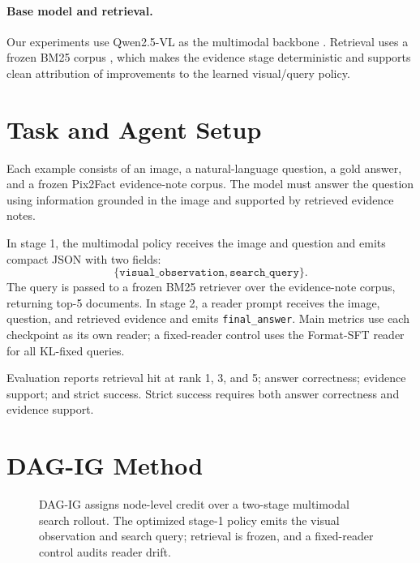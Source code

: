 \documentclass[11pt]{article}
\begin{document}
\paragraph{Base model and retrieval.}
Our experiments use Qwen2.5-VL as the multimodal backbone \cite{qwen2025qwen25vl}. Retrieval uses a frozen BM25 corpus \cite{robertson1994okapi}, which makes the evidence stage deterministic and supports clean attribution of improvements to the learned visual/query policy.

\section{Task and Agent Setup}

Each example consists of an image, a natural-language question, a gold answer, and a frozen Pix2Fact evidence-note corpus. The model must answer the question using information grounded in the image and supported by retrieved evidence notes.

In stage 1, the multimodal policy receives the image and question and emits compact JSON with two fields:
\[
\{\texttt{visual\_observation},\texttt{search\_query}\}.
\]
The query is passed to a frozen BM25 retriever over the evidence-note corpus, returning top-5 documents. In stage 2, a reader prompt receives the image, question, and retrieved evidence and emits \texttt{final\_answer}. Main metrics use each checkpoint as its own reader; a fixed-reader control uses the Format-SFT reader for all KL-fixed queries.

Evaluation reports retrieval hit at rank 1, 3, and 5; answer correctness; evidence support; and strict success. Strict success requires both answer correctness and evidence support.

\section{DAG-IG Method}

\begin{figure}[t]
\centering
\resizebox{\linewidth}{!}{}
\caption{DAG-IG assigns node-level credit over a two-stage multimodal search rollout. The optimized stage-1 policy emits the visual observation and search query; retrieval is frozen, and a fixed-reader control audits reader drift.}
\label{fig:method}
\end{figure}


\end{document}
